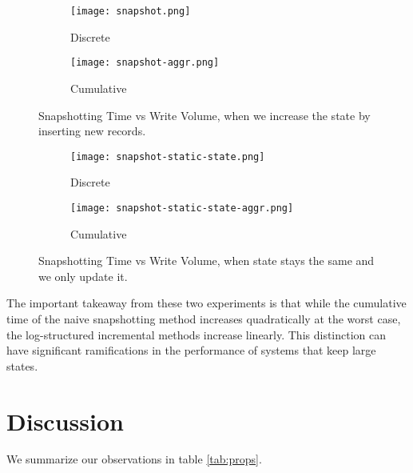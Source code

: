 \begin{figure}[h]
    \begin{subfigure}{.5\textwidth}
        \centering
        \texttt{[image: snapshot.png]}
        \caption{Discrete}
    \end{subfigure}
    \begin{subfigure}{.5\textwidth}
        \centering
        \texttt{[image: snapshot-aggr.png]}
        \caption{Cumulative}
    \end{subfigure}
    \caption{Snapshotting Time vs Write Volume, when we increase the state by inserting new records.}
    \label{fig:snapshot}
\end{figure}

\begin{figure}[h]
    \begin{subfigure}{.5\textwidth}
        \centering
        \texttt{[image: snapshot-static-state.png]}
        \caption{Discrete}
    \end{subfigure}
    \begin{subfigure}{.5\textwidth}
        \centering
        \texttt{[image: snapshot-static-state-aggr.png]}
        \caption{Cumulative}
    \end{subfigure}
    \caption{Snapshotting Time vs Write Volume, when state stays the same and we only update it.}
    \label{fig:snapshot-static-state}
\end{figure}

The important takeaway from these two experiments is that while the cumulative time of the naive snapshotting method increases quadratically at the worst case, the log-structured incremental methods increase linearly. This distinction can have significant ramifications in the performance of systems that keep large states.

\section{Discussion}

We summarize our observations in table \ref{tab:props}.


